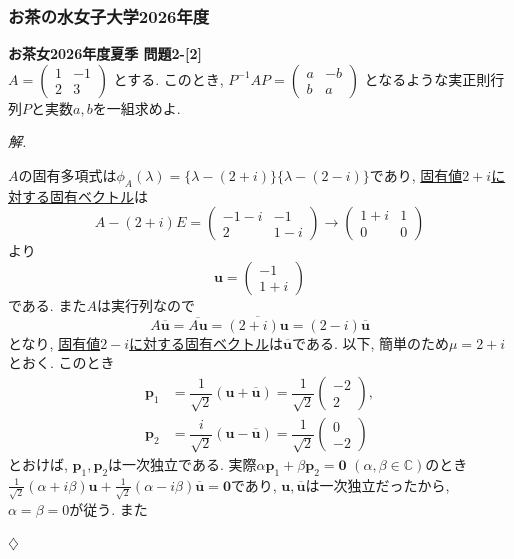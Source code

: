 \documentclass[titlepage]{jsarticle}
\numberwithin{equation}{section}
\newcommand{\C}{\mathbb{C}}%
\newenvironment{kaitou}[1][解]{%
\begin{proofbox}%
\textit{#1. }\ignorespaces
}{%
\hfill$\diamondsuit$%
\end{proofbox}%
}
\begin{document}
\subsubsection{お茶の水女子大学2026年度}
\begin{problem}
\textbf{お茶女2026年度夏季 問題2-[2]}\\
$A = \displaystyle{
\begin{pmatrix}
1 & -1\\
2 & 3
\end{pmatrix}
}$
とする. このとき, $P^{-1}AP =
\begin{pmatrix}
a & -b\\
b & a
\end{pmatrix}$
となるような実正則行列$P$と実数$a, b$を一組求めよ.
\end{problem}
\begin{kaitou}
$A$の固有多項式は$\phi_A(\lambda) = \{\lambda - (2 + i)\}\{\lambda - (2 - i)\}$であり, \uline{固有値$2+i$に対する固有ベクトル}は
\[
A - (2 + i)E = 
\begin{pmatrix}
-1-i & -1\\
2 & 1-i
\end{pmatrix}
\to
\begin{pmatrix}
1+i & 1\\
0 & 0
\end{pmatrix}
\]
より
\[
\bm{u} = 
\begin{pmatrix}
-1\\
1+i
\end{pmatrix}
\]
である. また$A$は実行列なので
\[
A\overline{\bm{u}} = \overline{A\bm{u}} = \overline{(2 + i)\bm{u}} = (2-i)\overline{\bm{u}}
\]
となり, \uline{固有値$2-i$に対する固有ベクトル}は$\overline{\bm{u}}$である. 以下, 簡単のため$\mu = 2+i$とおく. このとき
\begin{align*}
\bm{p}_1 &= \dfrac{1}{\sqrt{2}}(\bm{u} + \overline{\bm{u}}) = \dfrac{1}{\sqrt{2}}
\begin{pmatrix}
-2\\
2
\end{pmatrix}, \\
\bm{p}_2 &= \dfrac{i}{\sqrt{2}}(\bm{u} - \overline{\bm{u}}) = \dfrac{1}{\sqrt{2}}
\begin{pmatrix}
0\\
-2
\end{pmatrix}
\end{align*}
とおけば, $\bm{p}_1, \bm{p}_2$は一次独立である. 実際$\alpha\bm{p}_1 + \beta\bm{p}_2 = \bm{0}\,\,(\alpha, \beta \in \C)$のとき$\frac{1}{\sqrt{2}}(\alpha + i\beta)\bm{u} + \frac{1}{\sqrt{2}}(\alpha - i\beta)\overline{\bm{u}} = \bm{0}$であり, $\bm{u}, \overline{\bm{u}}$は一次独立だったから, $\alpha = \beta = 0$が従う. また

\end{kaitou}
\end{document}

